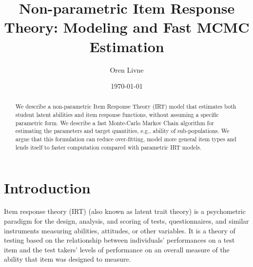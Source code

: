 \documentclass{article}
\begin{document}
\title{Non-parametric Item Response Theory: Modeling and Fast MCMC Estimation}
\author{Oren Livne}
\date{\today}

\maketitle

\begin{abstract}
  We describe a non-parametric Item Response Theory (IRT) model that estimates both student latent
  abilities and item response functions, without assuming a specific parametric form. We
  describe a fast Monte-Carlo Markov Chain algorithm for estimating the parameters
  and target quantities, e.g., ability of sub-populations. We argue that this formulation
  can reduce over-fitting, model more general item types and lends itself to faster computation
  compared with parametric IRT models.
\end{abstract}

\section{Introduction}
Item response theory (IRT) (also known as latent trait theory) is a psychometric paradigm for the design, analysis, and scoring of tests, questionnaires, and similar instruments measuring abilities, attitudes, or other variables. It is a theory of testing based on the relationship between individuals' performances on a test item and the test takers' levels of performance on an overall measure of the ability that item was designed to measure.
\end{document}
